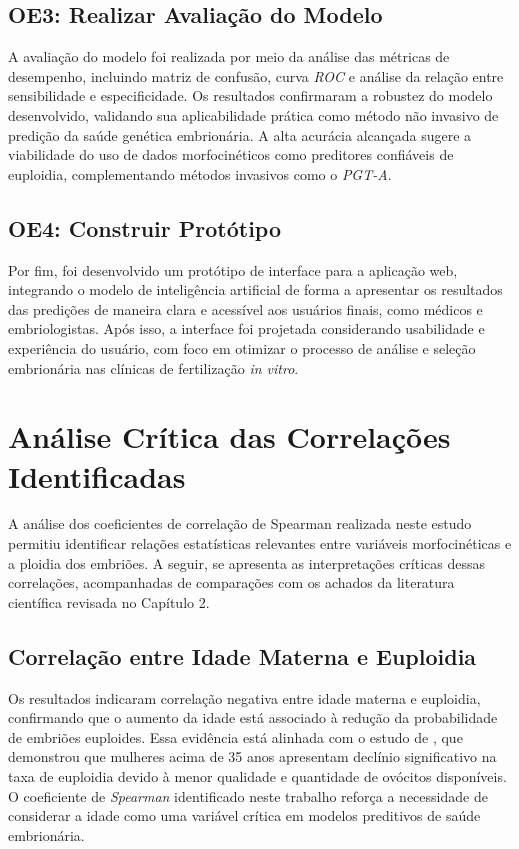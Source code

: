 \subsection{OE3: Realizar Avaliação do Modelo}
A avaliação do modelo foi realizada por meio da análise das métricas de desempenho, incluindo matriz de confusão, curva \textit{ROC} e análise da relação entre sensibilidade e especificidade. Os resultados confirmaram a robustez do modelo desenvolvido, validando sua aplicabilidade prática como método não invasivo de predição da saúde genética embrionária. A alta acurácia alcançada sugere a viabilidade do uso de dados morfocinéticos como preditores confiáveis de euploidia, complementando métodos invasivos como o \textit{PGT-A}.

\subsection{OE4: Construir Protótipo}
Por fim, foi desenvolvido um protótipo de interface para a aplicação web, integrando o modelo de inteligência artificial de forma a apresentar os resultados das predições de maneira clara e acessível aos usuários finais, como médicos e embriologistas. Após isso, a interface foi projetada considerando usabilidade e experiência do usuário, com foco em otimizar o processo de análise e seleção embrionária nas clínicas de fertilização \textit{in vitro}.

\section{Análise Crítica das Correlações Identificadas}
A análise dos coeficientes de correlação de Spearman realizada neste estudo permitiu identificar relações estatísticas relevantes entre variáveis morfocinéticas e a ploidia dos embriões. A seguir, se apresenta as interpretações críticas dessas correlações, acompanhadas de comparações com os achados da literatura científica revisada no Capítulo 2.

\subsection{Correlação entre Idade Materna e Euploidia}
Os resultados indicaram correlação negativa entre idade materna e euploidia, confirmando que o aumento da idade está associado à redução da probabilidade de embriões euploides. Essa evidência está alinhada com o estudo de , que demonstrou que mulheres acima de 35 anos apresentam declínio significativo na taxa de euploidia devido à menor qualidade e quantidade de ovócitos disponíveis. O coeficiente de \textit{Spearman} identificado neste trabalho reforça a necessidade de considerar a idade como uma variável crítica em modelos preditivos de saúde embrionária.


